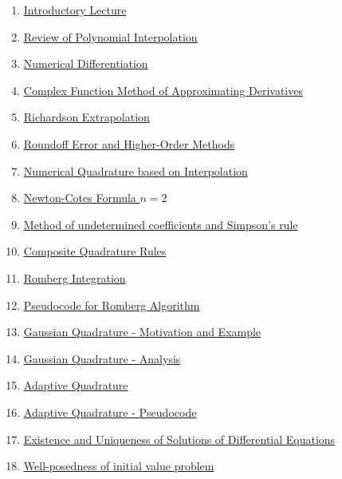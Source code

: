 \documentclass[11pt]{article}
\begin{document}
\begin{enumerate}
	\item \href{https://mp.weixin.qq.com/s/3T37SbenNK6vJipvdvt-OA}{Introductory Lecture}	%
	\item \href{https://mp.weixin.qq.com/s/9mXDu6whW9fGa-3VXplvVA}{Review of Polynomial Interpolation}	%
	\item \href{https://mp.weixin.qq.com/s/4mo8nBsbThIphINt-biNXw}{Numerical Differentiation}	%
	\item \href{https://mp.weixin.qq.com/s/KLh_s5HQgc3PjknOUQxI1w}{Complex Function Method of Approximating Derivatives}	%
	\item \href{https://mp.weixin.qq.com/s/usPRilnlQSX3wUBGuBljyg}{Richardson Extrapolation}	%
	\item \href{https://mp.weixin.qq.com/s/3ymNOdhfSvG_PZbz1elYXQ}{Roundoff Error and Higher-Order Methods}	%
	\item \href{https://mp.weixin.qq.com/s/7HzS5A_JIsXTh9P3wFISGQ}{Numerical Quadrature based on Interpolation}	%
	\item \href{https://mp.weixin.qq.com/s/qyXHZxEj65nRw2uMLM3NcQ}{Newton-Cotes Formula $n = 2$}	%
	\item \href{https://mp.weixin.qq.com/s/uzvolIMfliESvGMBUCTlVQ}{Method of undetermined coefficients and Simpson's rule}	%
	\item \href{https://mp.weixin.qq.com/s/xKb8ZHDHU297zh-7yNJ0BQ}{Composite Quadrature Rules}	%
	\item \href{https://mp.weixin.qq.com/s/xJm1aCzODppTRMc0a3PxaQ}{Romberg Integration}	%
	\item \href{https://mp.weixin.qq.com/s/gkOUKmUe-cJKnXDz7PO7bg}{Pseudocode for Romberg Algorithm}	%
	\item \href{https://mp.weixin.qq.com/s/BJ7FC6awtfApAPXgz8ap2A}{Gaussian Quadrature - Motivation and Example}	%
	\item \href{https://mp.weixin.qq.com/s/U95SBj3Rne2p5LyAd1STDA}{Gaussian Quadrature - Analysis}	%
	\item \href{https://mp.weixin.qq.com/s/SdYkYYak0XtIhPUZt7VVYw}{Adaptive Quadrature}	%
	\item \href{https://mp.weixin.qq.com/s/8SS-7tL0G3V7vDBvFX22BA}{Adaptive Quadrature - Pseudocode}	%
	\item \href{https://mp.weixin.qq.com/s/ZE4JLmpbw9zFB7-Dgz8FSw}{Existence and Uniqueness of Solutions of Differential Equations}	%
	\item \href{https://mp.weixin.qq.com/s/_80EIQ9y3uccz57nmteL6g}{Well-posedness of initial value problem}	%

\end{enumerate}
\end{document}

